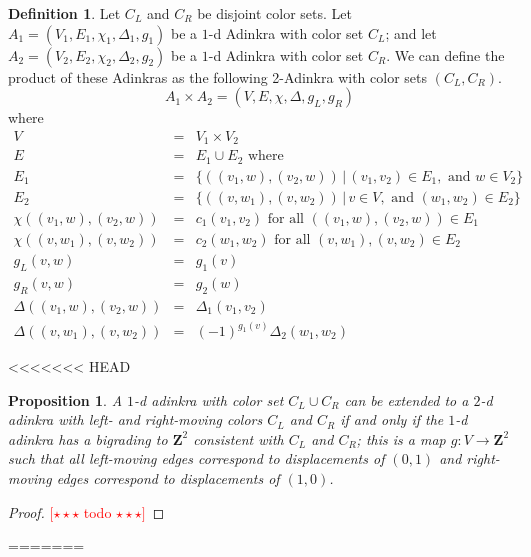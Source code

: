 \documentclass[12pt,twoside,singlespace]{article}
\numberwithin{equation}{section}
\newtheorem{prop}[equation]{Proposition}
\theoremstyle{definition}
\newtheorem{definition}[equation]{Definition}
\newcommand{\ZZ}{\mathbf{Z}}
\newcommand{\com}[1]{\textcolor{red}{$[\star \star \star$ #1 $\star \star \star]$}}
\begin{document}
\begin{definition}
Let $C_L$ and $C_R$ be disjoint color sets.  Let $A_1=(V_1, E_1, \chi_1, \Delta_1,g_1)$ be a $1$-d Adinkra with color set $C_L$; and let $A_2=(V_2, E_2, \chi_2, \Delta_2,g_2)$ be a $1$-d Adinkra with color set $C_R$.  We can define the product of these Adinkras as the following 2-Adinkra with color sets $(C_L,C_R)$.
\[A_1\times A_2=(V,E,\chi,\Delta,g_L,g_R)\]
where
\begin{eqnarray*}
V&=&V_1\times V_2\\
E&=&E_1\cup E_2\mbox{ where}\\
E_1&=&\{((v_1,w),(v_2,w))\,|\,(v_1, v_2)\in E_1,\mbox{ and } w\in V_2\}\\
E_2&=&\{((v,w_1),(v,w_2))\,|\,v\in V, \mbox{ and }(w_1,w_2)\in E_2\}\\
\chi((v_1,w),(v_2,w))&=&c_1(v_1,v_2)\mbox{ for all $((v_1,w),(v_2,w))\in E_1$}\\
\chi((v,w_1),(v,w_2))&=&c_2(w_1,w_2)\mbox{ for all $(v,w_1),(v,w_2)\in E_2$}\\
g_L(v,w)&=&g_1(v)\\
g_R(v,w)&=&g_2(w)\\
\Delta((v_1,w),(v_2,w))&=&\Delta_1(v_1,v_2)\\
\Delta((v,w_1),(v,w_2))&=&(-1)^{g_1(v)}\Delta_2(w_1,w_2)
\end{eqnarray*}
\end{definition}



<<<<<<< HEAD
\begin{prop}
A $1$-d adinkra with color set $C_L \cup C_R$ can be extended to a $2$-d adinkra with left- and right-moving colors $C_L$ and $C_R$ if and only if the $1$-d adinkra has a \emph{bigrading} to $\ZZ^2$ consistent with $C_L$ and $C_R$; this is a map $g: V \rightarrow \ZZ^2$ such that all left-moving edges correspond to displacements of $(0, 1)$ and right-moving edges correspond to displacements of $(1, 0)$.
\end{prop}

\begin{proof}
\com{todo}
\end{proof}

\begin{comment}
This grading allows us to define the notation $V(A, (x,y))$, which is the set of vertices of $A$ of grading $(x,y) \in \ZZ^2$. We will also use the notation $V(A, r)$ to similarly refer to vertices of $A$ of grading $r \in \ZZ$ when referring to $1$-d adinkras, which will come up in our study. Notice that when we consider a $2$-d adinkra as a $1$-d adinkra, we have the relation
\[
V(A,r) = \cup_{x + y = r} V(A, (x,y)).
\]
\end{comment}
=======
\end{document}
